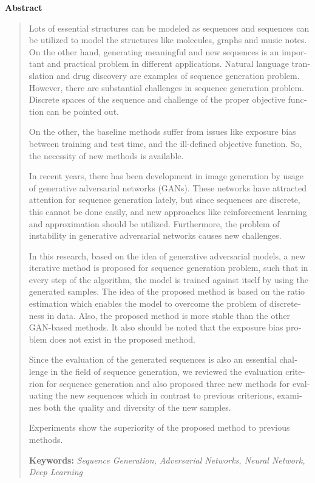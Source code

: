 \thispagestyle{empty} 

\begin{latin}
\centerline{\textbf{\large{Abstract}}}
\begin{quote}
	
Lots of essential structures can be modeled as sequences and sequences can be utilized to model the structures like molecules, graphs and music notes. On the other hand, generating meaningful and new sequences is an important and practical problem in different applications. Natural language translation and drug discovery are examples of sequence generation problem. However, there are substantial challenges in sequence generation problem. Discrete spaces of the sequence and challenge of the proper objective function can be pointed out. 

On the other, the baseline methods suffer from issues like exposure bias between training and test time, and the ill-defined objective function. So, the necessity of new methods is available.

In recent years, there has been development in image generation by usage of generative adversarial networks (GANs). These networks have attracted attention for sequence generation lately, but since sequences are discrete, this cannot be done easily, and new approaches like reinforcement learning and approximation should be utilized. Furthermore, the problem of instability in generative adversarial networks causes new challenges.

In this research, based on the idea of generative adversarial models, a new iterative method is proposed for sequence generation problem, such that in every step of the algorithm, the model is trained against itself by using the generated samples. 
The idea of the proposed method is based on the ratio estimation which enables the model to overcome the problem of discreteness in data. Also, the proposed method is more stable than the other GAN-based methods. It also should be noted that the exposure bias problem does not exist in the proposed method.

Since the evaluation of the generated sequences is also an essential challenge in the field of sequence generation, we reviewed the evaluation criterion for sequence generation and also proposed three new methods for evaluating the new sequences which in contrast to previous criterions, examines both the quality and diversity of the new samples.

Experiments show the superiority of the proposed method to previous methods.


\vskip 1cm
\textbf{Keywords:} \textit{Sequence Generation, Adversarial Networks, Neural Network, Deep Learning}
\end{quote}
\end{latin}

